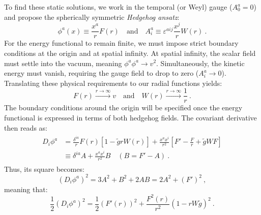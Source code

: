 \documentclass[a4paper,11pt]{article}
\begin{document}
To find these static solutions, we work in the temporal (or Weyl) gauge ($A_{0}^{a}=0$) and propose the spherically symmetric \textit{Hedgehog ansatz}:
\begin{equation}\label{Hedgehogansatz}
    \phi^a(x) \equiv \frac{x^a}{r} F(r) \quad \text{and} \quad A_i^a \equiv \varepsilon^{aij} \frac{x^j}{r} W(r)\ .
\end{equation}
For the energy functional to remain finite, we must impose strict boundary conditions at the origin and at spatial infinity. At spatial infinity, the scalar field must settle into the vacuum, meaning $\phi^{a}\phi^{a}\rightarrow v^{2}$. Simultaneously, the kinetic energy must vanish, requiring the gauge field to drop to zero ($A_{i}^{a}\rightarrow0$). Translating these physical requirements to our radial functions yields:
\begin{equation}
    F(r) \xrightarrow{r\to\infty} v \quad \text{and} \quad W(r) \xrightarrow{r\to\infty} \frac{1}{r}\ .
\end{equation}
The boundary conditions around the origin will be specified once the energy functional is expressed in terms of both hedgehog fields. The covariant derivative then reads as:
\begin{align}
    \begin{split}
          D_i \phi^a &= \frac{\delta^{ia}}{r} F(r) \left[ 1 - \tilde{g} r W(r) \right] + \frac{x^a x^i}{r^2} \left[ F' - \frac{F}{r} + \tilde{g} W F \right]\\
           &\equiv \delta^{ia} A + \frac{x^a x^i}{r^2}B \quad (B = F' - A)\ .
    \end{split}
\end{align}
Thus, its square becomes:
\begin{equation}
    (D_i \phi^a)^2 = 3A^2 + B^2 + 2AB=2A^2 + (F')^2\ , 
\end{equation}
meaning that:
\begin{equation}
    \frac{1}{2} (D_i \phi^a)^2 = \frac{1}{2} (F'(r))^2 + \frac{F^2(r)}{r^2} (1 - r W \tilde{g})^2\ .
\end{equation}
\end{document}
